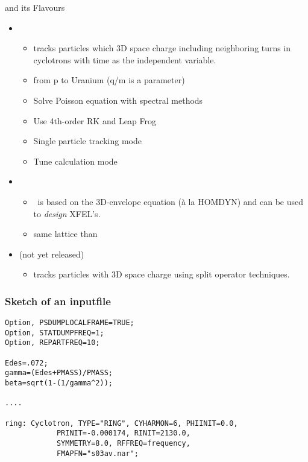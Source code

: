 \documentclass[xcolor=pdftex,table,10pt,yellow,mathserif]{beamer}
\begin{document}
\begin{frame}{\opal and its Flavours} {}
\begin{itemize}
\item \opalcycl 
\begin{itemize}
\item \opalcycl tracks particles which 3D space charge including neighboring turns in cyclotrons
with time as the independent variable. 
\item from p to Uranium (q/m is a parameter) 
\item Solve Poisson equation with spectral methods
    \item Use 4th-order RK and Leap Frog
      \item Single particle tracking mode
      \item Tune calculation mode   
\end{itemize}
\item \opalenv\ 
\begin{itemize}
\item \opalenv\ is based on the 3D-envelope equation (\`a la HOMDYN) and can be used to {\em design} XFEL's.
\item same lattice than \opalt
\end{itemize}
\item \opalmap (not yet released)
\begin{itemize}
\item \opalmap tracks particles with 3D space charge using split operator techniques.
\end{itemize}
\end{itemize}


\end{frame}

\begin{frame}[fragile]
\frametitle{Sketch of an inputfile} 
\begin{verbatim}
Option, PSDUMPLOCALFRAME=TRUE;
Option, STATDUMPFREQ=1;
Option, REPARTFREQ=10;

Edes=.072;
gamma=(Edes+PMASS)/PMASS;
beta=sqrt(1-(1/gamma^2));

....

ring: Cyclotron, TYPE="RING", CYHARMON=6, PHIINIT=0.0,
			PRINIT=-0.000174, RINIT=2130.0,
			SYMMETRY=8.0, RFFREQ=frequency,
			FMAPFN="s03av.nar";

\end{verbatim}
\end{frame}
\end{document}
